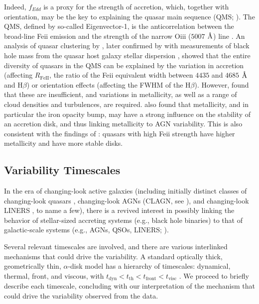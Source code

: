 \documentclass[twocolumn]{aastex62}
\let\oldAA\AA
\renewcommand{\AA}{\text{\normalfont\oldAA}}
\begin{document}
Indeed, $f_{Edd}$ is a proxy for the strength of accretion, which, together with orientation, may be the key to explaining the quasar main sequence (QMS; \citealt{shen2014, marziani2018}). The QMS, defined by so-called Eigenvector-1, is the anticorrelation between the broad-line Fe{\sc ii} emission and the strength of the narrow O{\sc iii} ($5007$ $\mbox{\AA}$) line \citep{wang1996}. An analysis of quasar clustering by \citet{shen2014}, later confirmed by \citet{sun2015} with measurements of  black hole mass from the quasar host galaxy stellar dispersion \citep{ferrarese2000, kormendy2013}, showed that the entire diversity of quasars in the QMS can be explained by the variation in accretion (affecting $R_{\mathrm{Fe  II}}$, the ratio of the  Fe{\sc ii} equivalent width between $4435$ and $4685$ $\mbox{\AA}$ and H$\beta$) or orientation effects (affecting the FWHM of the H$\beta$). However, \citet{panda2019a, panda2019b} found that these are insufficient, and variations in metallicity, as well as a range of cloud densities and turbulences, are required.  \cite{jiang2016} also found that metallicity, and in particular the iron opacity bump, may have a strong influence on the stability of an accretion disk, and thus linking metallicity to AGN variability. This is also consistent with the findings of \cite{sun2018}: quasars with high  Fe{\sc ii} strength have higher metallicity and have more stable disks. 


\subsection{Variability Timescales}

In the era of changing-look active galaxies (including initially distinct classes of changing-look quasars \citep{lamassa2015, macleod2019}, changing-look AGNs (CLAGN, see \citealt{bianchi2009, risaliti2009,marchese2012}), and changing-look LINERS \citep{frederick2019}, to name a few), there is a revived interest in possibly linking the behavior of stellar-sized accreting systems (e.g., black hole binaries) to that of galactic-scale systems (e.g., AGNs, QSOs, LINERS; \citealt{noda2018, ruan2019}). 

Several relevant timescales are involved, and there are various interlinked mechanisms that could drive the variability. A standard optically thick, geometrically thin, $\alpha$-disk model has a hierarchy of timescales: dynamical, thermal, front, and viscous, with   $t_{\mathrm{dyn}} < t_{\mathrm{th}} < t_{\mathrm{front}}  < t_{\mathrm{visc}} $ \citep{netzer2013, frank2002}. We proceed to briefly describe  each timescale, concluding with our interpretation of the mechanism that could drive the variability observed from the data. 
\end{document}
